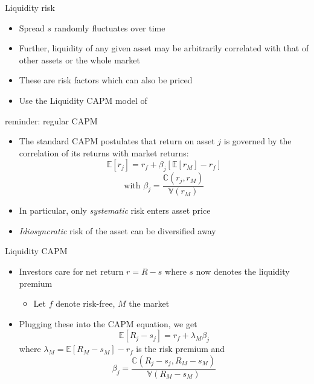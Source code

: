 \documentclass[english,10pt
,aspectratio=169
]{beamer}
\begin{document}
\begin{frame}{Liquidity risk}
	\begin{itemize}
		\item Spread $s$ randomly fluctuates over time
		\item Further, liquidity of any given asset may be arbitrarily correlated with that of other assets or the whole market
		\item These are risk factors which can also be priced
		\item Use the Liquidity CAPM model of \cite{acharya_asset_2005}
	\end{itemize}
\end{frame}


\begin{frame}{reminder: regular CAPM}
	\begin{itemize}
		\item The standard CAPM postulates that return on asset $j$ is governed by the correlation of its returns with market returns:
		\begin{equation*}
			\mathbb{E}[r_j] = r_f + \beta_j \left[ \mathbb{E}[r_M] - r_f \right]
		\end{equation*}
		\begin{equation*}
			\text{with } \beta_j = \frac{\mathbb{C}(r_j, r_M)}{\mathbb{V}(r_M)}
		\end{equation*}
		\item In particular, only \emph{systematic} risk enters asset price
		\item \emph{Idiosyncratic} risk of the asset can be diversified away
	\end{itemize}
\end{frame}


\begin{frame}{Liquidity CAPM}
	\begin{itemize}
		\item Investors care for net return $r=R-s$ where $s$ now denotes the liquidity premium
		\begin{itemize}
			\item Let $f$ denote risk-free, $M$ the market
		\end{itemize}
		\item Plugging these into the CAPM equation, we get
		\[
		\mathbb{E}[R_j-s_j]=r_f + \lambda_M \beta_j
		\]
		where $\lambda_M = \mathbb{E}[R_M-s_M]-r_f$ is the risk premium and
		\[
		\beta_j=\frac{\mathbb{C}(R_j-s_j, R_M-s_M)}{\mathbb{V}(R_M-s_M)}
		\]
	\end{itemize}
\end{frame}
\end{document}
